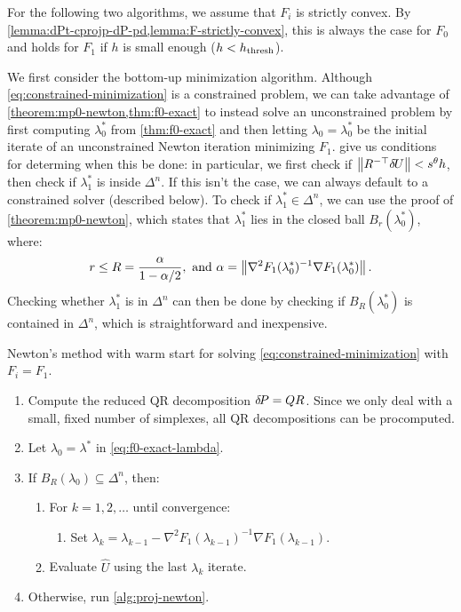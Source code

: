 \documentclass[eikonal.tex]{subfiles}
\begin{document}
For the following two algorithms, we assume that $F_i$ is strictly
convex. By \cref{lemma:dPt-cprojp-dP-pd,lemma:F-strictly-convex}, this
is always the case for $F_0$ and holds for $F_1$ if $h$ is small
enough ($h < h_{\operatorname{thresh}}$).

We first consider the bottom-up minimization algorithm. Although
\cref{eq:constrained-minimization} is a constrained problem, we can
take advantage of \cref{theorem:mp0-newton,thm:f0-exact} to instead
solve an unconstrained problem by first computing $\lambda_0^*$ from
\cref{thm:f0-exact} and then letting $\lambda_0 = \lambda_0^*$ be the
initial iterate of an unconstrained Newton iteration minimizing
$F_1$.  give us conditions for
determing when this be done: in particular, we first check if
$\left\|R^{-\top} {\delta \hspace{-0.09em} U}\right\| < s^\theta h$, then check if $\lambda_1^*$
is inside $\Delta^n$. If this isn't the case, we can always default to
a constrained solver (described below). To check if
$\lambda_1^* \in \Delta^n$, we can use the proof of
\cref{theorem:mp0-newton}, which states that $\lambda_1^*$ lies in the
closed ball $B_r(\lambda_0^*)$, where:
\begin{equation}
  r \leq R = \frac{\alpha}{1 - \alpha/2}, \mbox{ and } \alpha = \left\|\nabla^2 F_1(\lambda_0^*)^{-1} \nabla F_1(\lambda_0^*)\right\|.
\end{equation}
Checking whether $\lambda_1^*$ is in $\Delta^n$ can then be done by
checking if $B_R(\lambda_0^*)$ is contained in $\Delta^n$, which is
straightforward and inexpensive.

\begin{algorithm}[H]
  \caption{Newton's method with warm start for solving
    \cref{eq:constrained-minimization} with
    $F_i = F_1$.}\label{alg:warm-start-newton}
  \begin{enumerate}[nolistsep]
  \item Compute the reduced QR decomposition ${\delta \hspace{-0.14em} P} = QR$. Since we
    only deal with a small, fixed number of simplexes, all QR
    decompositions can be procomputed.
  \item Let $\lambda_0 = \lambda^*$ in \cref{eq:f0-exact-lambda}.
  \item If $B_R(\lambda_0) \subseteq \Delta^n$, then:
    \begin{enumerate}[nolistsep]
    \item For $k = 1, 2, \hdots$ until convergence:
      \begin{enumerate}
      \item Set
        $\lambda_k = \lambda_{k-1} - \nabla^2
        F_1(\lambda_{k-1})^{-1} \nabla
        F_1(\lambda_{k-1})$.
      \end{enumerate}
    \item Evaluate $\hat{U}$ using the last $\lambda_k$ iterate.
    \end{enumerate}
  \item Otherwise, run \cref{alg:proj-newton}.
  \end{enumerate}
\end{algorithm}
\end{document}

